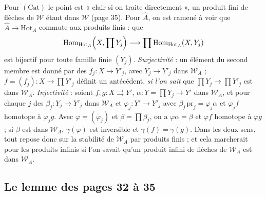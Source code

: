 \documentclass[11pt,a4paper]{article}
\begin{document}
Pour $(\mathrm{Cat})$ le point est « clair si on traite directement », un
produit fini de flèches de $\mathcal{W}$ étant dans $\mathcal{W}$ (page 35).
Pour $\widehat{A}$, on est ramené à voir que $\widehat{A} \to \mathrm{Hot}_{A}$
commute aux produits finis : que
\[
\mathrm{Hom}_{\mathrm{Hot}_{A}}\Bigl(X, \prod Y_{j}\Bigr) \longrightarrow
\prod \mathrm{Hom}_{\mathrm{Hot}_{A}}(X, Y_{j})
\]
est bijectif pour toute famille finie $(Y_{j})$. \emph{Surjectivité} : un
élément du second membre est donné par des $f_{j} : X \to Y'_{j}$, avec
$Y_{j} \to Y'_{j}$ dans $\mathcal{W}_{A}$ ; $f = (f_{j}) : X \to \prod Y'_{j}$
définit un antécédent, \emph{si l'on sait} que $\prod Y_{j} \to \prod Y'_{j}$
est dans $\mathcal{W}_{A}$. \emph{Injectivité} : soient
$f, g : X \rightrightarrows Y'$, $\alpha : Y = \prod Y_{j} \to Y'$ dans
$\mathcal{W}_{A}$, et pour chaque $j$ des $\beta_{j} : Y_{j} \to Y'_{j}$ dans
$\mathcal{W}_{A}$ et $\varphi_{j} : Y' \to Y'_{j}$ avec
$\beta_{j}\,\mathrm{pr}_{j} = \varphi_{j}\alpha$ et $\varphi_{j}f$ homotope à
$\varphi_{j}g$. Avec $\varphi = (\varphi_{j})$ et $\beta = \prod \beta_{j}$,
on a $\varphi\alpha = \beta$ et $\varphi f$ homotope à $\varphi g$ ; si
$\beta$ est dans $\mathcal{W}_{A}$, $\gamma(\varphi)$ est inversible et
$\gamma(f) = \gamma(g)$. Dans les deux sens, tout repose donc sur la
stabilité de $\mathcal{W}_{A}$ par produits finis ; et cela marcherait pour
les produits infinis si l'on savait qu'un produit infini de flèches de
$\mathcal{W}_{A}$ est dans $\mathcal{W}_{A}$.

\subsection*{Le lemme des pages 32 à 35}
\end{document}
